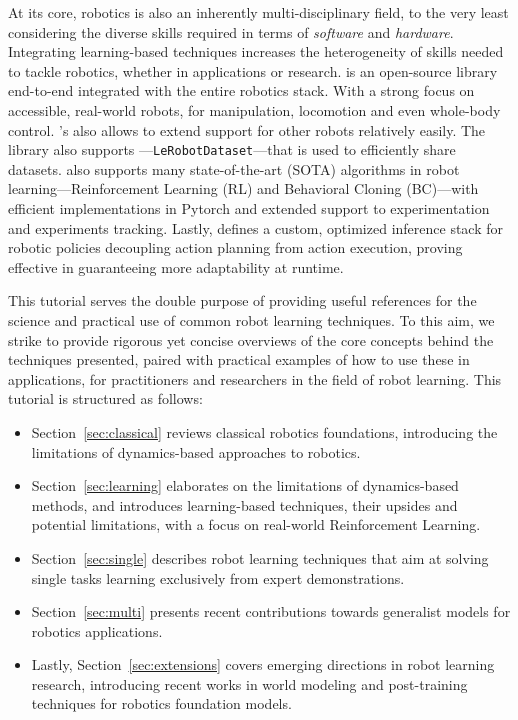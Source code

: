 At its core, robotics is also an inherently multi-disciplinary field, to the very least considering the diverse skills required in terms of \emph{software} and \emph{hardware}.
Integrating learning-based techniques increases the heterogeneity of skills needed to tackle robotics, whether in applications or research.
\lerobot is an open-source library end-to-end integrated with the entire robotics stack.
With a strong focus on accessible, real-world robots,  for manipulation, locomotion and even whole-body control. 
\lerobot's  also allows to extend support for other robots relatively easily. 
The library also supports ---\texttt{LeRobotDataset}---that is used to efficiently share datasets. 
\lerobot also supports many state-of-the-art (SOTA) algorithms in robot learning---Reinforcement Learning (RL) and Behavioral Cloning (BC)---with efficient implementations in Pytorch and extended support to experimentation and experiments tracking.
Lastly, \lerobot defines a custom, optimized inference stack for robotic policies decoupling action planning from action execution, proving effective in guaranteeing more adaptability at runtime.

This tutorial serves the double purpose of providing useful references for the science and practical use of common robot learning techniques.
To this aim, we strike to provide rigorous yet concise overviews of the core concepts behind the techniques presented, paired with practical examples of how to use these in applications, for practitioners and researchers in the field of robot learning.
This tutorial is structured as follows:
\begin{itemize}
\item Section~\ref{sec:classical} reviews classical robotics foundations, introducing the limitations of dynamics-based approaches to robotics.
\item Section~\ref{sec:learning} elaborates on the limitations of dynamics-based methods, and introduces learning-based techniques, their upsides and potential limitations, with a focus on real-world Reinforcement Learning.
\item Section~\ref{sec:single} describes robot learning techniques that aim at solving single tasks learning exclusively from expert demonstrations.
\item Section~\ref{sec:multi} presents recent contributions towards generalist models for robotics applications.
\item Lastly, Section~\ref{sec:extensions} covers emerging directions in robot learning research, introducing recent works in world modeling and post-training techniques for robotics foundation models.
\end{itemize}


